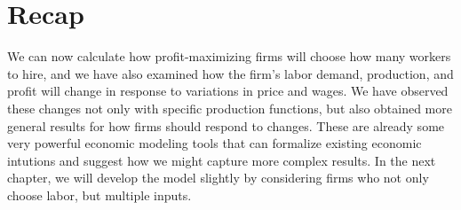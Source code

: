 \section*{Recap}
We can now calculate how profit-maximizing firms will choose how many workers to hire, and we have also examined how the firm's labor demand, production, and profit will change in response to variations in price and wages. We have observed these changes not only with specific production functions, but also obtained more general results for how firms should respond to changes. These are already some very powerful economic modeling tools that can formalize existing economic intutions and suggest how we might capture more complex results. In the next chapter, we will develop the model slightly by considering firms who not only choose labor, but multiple inputs. 
